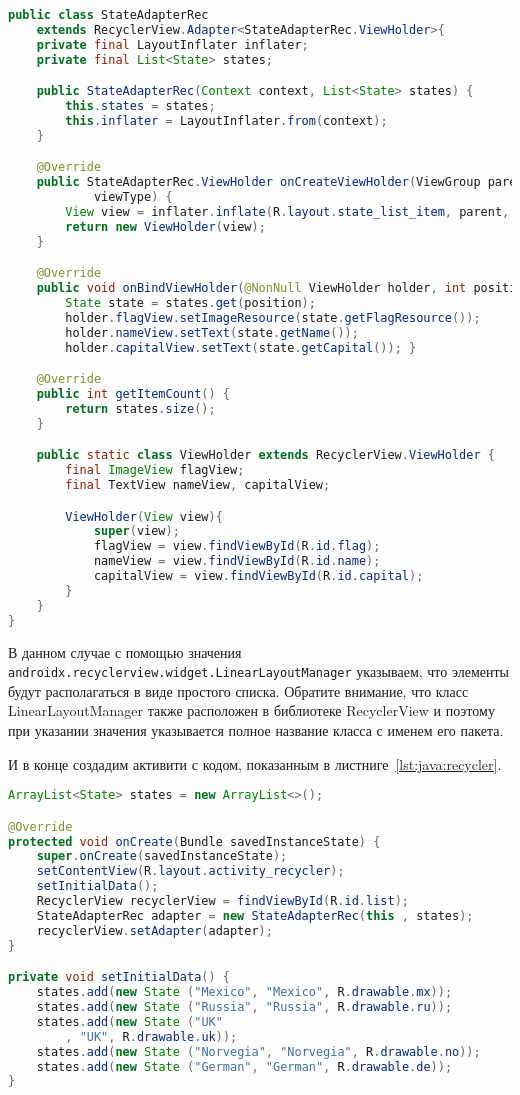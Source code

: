 \begin{lstlisting}[language=Java
	, label=lst:adapter:recycler
	]
public class StateAdapterRec
	extends RecyclerView.Adapter<StateAdapterRec.ViewHolder>{
	private final LayoutInflater inflater;
	private final List<State> states;

	public StateAdapterRec(Context context, List<State> states) {
		this.states = states;
		this.inflater = LayoutInflater.from(context);
	}

	@Override
	public StateAdapterRec.ViewHolder onCreateViewHolder(ViewGroup parent, int
			viewType) {
		View view = inflater.inflate(R.layout.state_list_item, parent, false);
		return new ViewHolder(view);
	}

	@Override
	public void onBindViewHolder(@NonNull ViewHolder holder, int position) {
		State state = states.get(position);
		holder.flagView.setImageResource(state.getFlagResource());
		holder.nameView.setText(state.getName());
		holder.capitalView.setText(state.getCapital()); }

	@Override
	public int getItemCount() {
		return states.size();
	}

	public static class ViewHolder extends RecyclerView.ViewHolder {
		final ImageView flagView;
		final TextView nameView, capitalView;

		ViewHolder(View view){
			super(view);
			flagView = view.findViewById(R.id.flag);
			nameView = view.findViewById(R.id.name);
			capitalView = view.findViewById(R.id.capital);
		}
	}
}
\end{lstlisting}

В данном случае с помощью значения
\texttt{androidx.recyclerview.widget.LinearLayoutManager} указываем, что
элементы будут располагаться в виде простого списка. Обратите внимание,
что класс LinearLayoutManager также расположен в библиотеке RecyclerView
и поэтому при указании значения указывается полное название класса с
именем его пакета.\par
И в конце создадим активити с кодом, показанным
в листниге~\ref{lst:java:recycler}.

\begin{lstlisting}[language=Java
	, label=lst:java:recycler
	]
ArrayList<State> states = new ArrayList<>();

@Override
protected void onCreate(Bundle savedInstanceState) {
	super.onCreate(savedInstanceState);
	setContentView(R.layout.activity_recycler);
	setInitialData();
	RecyclerView recyclerView = findViewById(R.id.list);
	StateAdapterRec adapter = new StateAdapterRec(this , states);
	recyclerView.setAdapter(adapter);
}

private void setInitialData() {
	states.add(new State ("Mexico", "Mexico", R.drawable.mx));
	states.add(new State ("Russia", "Russia", R.drawable.ru));
	states.add(new State ("UK"
		, "UK", R.drawable.uk));
	states.add(new State ("Norvegia", "Norvegia", R.drawable.no));
	states.add(new State ("German", "German", R.drawable.de));
}
\end{lstlisting}

